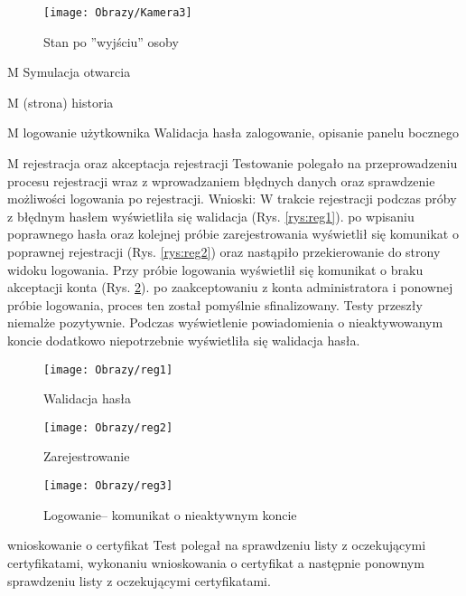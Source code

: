 \begin{enumerate*}
	\begin{figure}[ht!]
		\vspace{-1.7cm}
		\centering
		\texttt{[image: Obrazy/Kamera3]}
		\caption{Stan po ''wyjściu'' osoby}
		\label{rys:Kamera3}
	\end{figure}
\newpage
	\item M Symulacja otwarcia
	\item M (strona) historia
	\item M logowanie użytkownika
	Walidacja hasła 
	zalogowanie, 
	opisanie panelu bocznego
	\item M rejestracja oraz akceptacja rejestracji
	Testowanie polegało na przeprowadzeniu procesu rejestracji wraz z wprowadzaniem błędnych danych oraz sprawdzenie możliwości logowania po rejestracji.
	Wnioski: W trakcie rejestracji podczas próby z błędnym hasłem wyświetliła się walidacja (Rys. \ref{rys:reg1}). po wpisaniu poprawnego hasła oraz kolejnej próbie zarejestrowania wyświetlił się komunikat o poprawnej rejestracji (Rys. \ref{rys:reg2}) oraz nastąpiło przekierowanie do strony widoku logowania. Przy próbie logowania wyświetlił się komunikat o braku akceptacji konta (Rys. \ref{rys:reg3}). po zaakceptowaniu z konta administratora i ponownej próbie logowania, proces ten został pomyślnie sfinalizowany. Testy przeszły niemalże pozytywnie. Podczas wyświetlenie powiadomienia o nieaktywowanym koncie dodatkowo niepotrzebnie wyświetliła się walidacja hasła.   
	
		\begin{figure}[ht!]
		
		\begin{minipage}{0.2\textwidth}
			\texttt{[image: Obrazy/reg1]}
			\caption{Walidacja hasła }
			\label{rys:reg1}
		\end{minipage}
		\begin{minipage}{0.2\textwidth}
			\texttt{[image: Obrazy/reg2]}
			\caption{Zarejestrowanie}
			\label{rys:reg2}
		\end{minipage}
		
		\begin{minipage}{0.2\textwidth}
			\texttt{[image: Obrazy/reg3]}
			\caption{Logowanie-- komunikat o nieaktywnym koncie}
			\label{rys:reg3}
		\end{minipage}

	\end{figure}
	
	\item  wnioskowanie o certyfikat\newline
	Test polegał na sprawdzeniu listy z oczekującymi certyfikatami, wykonaniu wnioskowania o certyfikat a następnie ponownym sprawdzeniu listy z oczekującymi certyfikatami.
	

\end{enumerate*}
